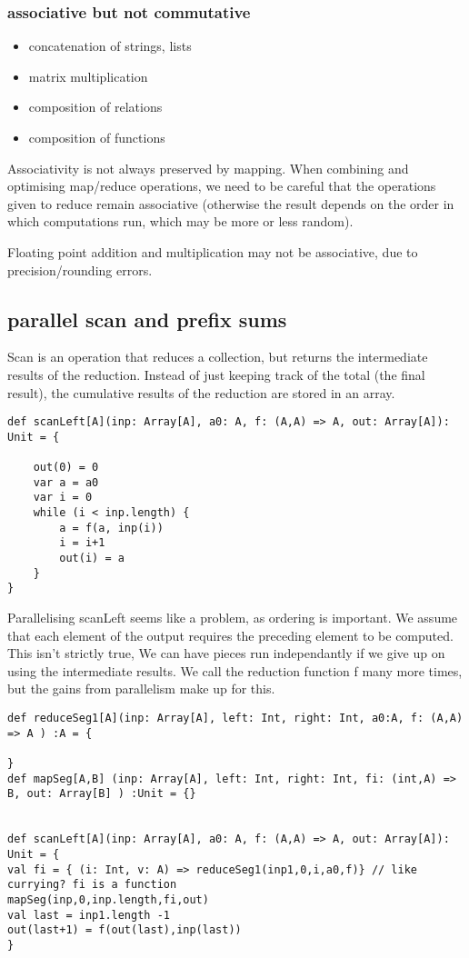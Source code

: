 \subsubsection{associative but not commutative}
\begin{itemize}
    \item concatenation of strings, lists
    \item matrix multiplication
    \item composition of relations
    \item composition of functions 
\end{itemize}

Associativity is not always preserved by mapping. When combining and optimising map/reduce operations, we need to be careful that the operations given to reduce remain associative (otherwise the result depends on the order in which computations run, which may be more or less random).

Floating point addition and multiplication may not be associative, due to precision/rounding errors.

\subsection{parallel scan and prefix sums}

Scan is an operation that  reduces a collection, but returns the intermediate results of the reduction. Instead of just keeping track of the total (the final result), the cumulative results of the reduction are stored in an array.

\begin{lstlisting}
def scanLeft[A](inp: Array[A], a0: A, f: (A,A) => A, out: Array[A]): Unit = {
    
    out(0) = 0
    var a = a0
    var i = 0
    while (i < inp.length) {
        a = f(a, inp(i))
        i = i+1
        out(i) = a
    }
}
\end{lstlisting}

Parallelising scanLeft seems like a problem, as ordering is important. We assume that each element of the output requires the preceding element to be computed. This isn't strictly true, We can have pieces run independantly if we give up on using the intermediate results. We call the reduction function f many more times, but the gains from parallelism make up for this.

\begin{lstlisting}
def reduceSeg1[A](inp: Array[A], left: Int, right: Int, a0:A, f: (A,A) => A ) :A = {
    
}
def mapSeg[A,B] (inp: Array[A], left: Int, right: Int, fi: (int,A) => B, out: Array[B] ) :Unit = {}


def scanLeft[A](inp: Array[A], a0: A, f: (A,A) => A, out: Array[A]): Unit = {
val fi = { (i: Int, v: A) => reduceSeg1(inp1,0,i,a0,f)} // like currying? fi is a function
mapSeg(inp,0,inp.length,fi,out)
val last = inp1.length -1
out(last+1) = f(out(last),inp(last))
}
\end{lstlisting}

